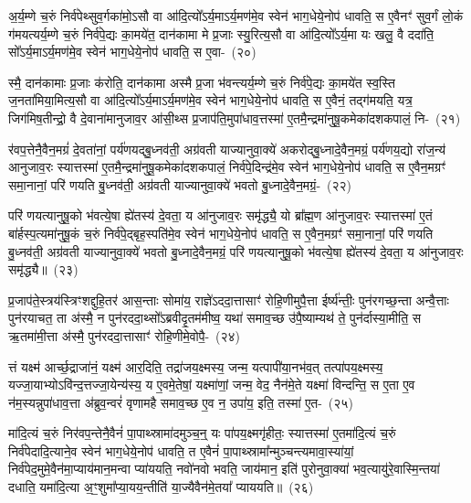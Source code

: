 {}

अ॒र्य॒म्णे च॒रुं निर्व॑पेथ्सुव॒र्गका॑मो॒\-ऽसौ वा आ॑दि॒त्यो᳚\-ऽर्य॒मा\-ऽर्य॒मण॑मे॒व स्वेन॑ भाग॒धेये॒नोप॑ धावति॒ स ए॒वैनꣳ॑ सुव॒र्गं लो॒कं ग॑मयत्यर्य॒म्णे च॒रुं निर्व॑पे॒द्यः का॒मये॑त॒ दान॑कामा मे प्र॒जाः स्यु॒रित्य॒सौ वा आ॑दि॒त्यो᳚\-ऽर्य॒मा यः खलु॒ वै ददा॑ति॒ सो᳚\-ऽर्य॒मा\-ऽर्य॒मण॑मे॒व स्वेन॑ भाग॒धेये॒नोप॑ धावति॒ स ए॒वा-~(२०)\ip

स्मै॒ दान॑कामाः प्र॒जाः क॑रोति॒ दान॑कामा अस्मै प्र॒जा भ॑वन्त्यर्य॒म्णे च॒रुं निर्व॑पे॒द्यः का॒मये॑त स्व॒स्ति ज॒नता॑मिया॒मित्य॒सौ वा आ॑दि॒त्यो᳚\-ऽर्य॒मा\-ऽर्य॒मण॑मे॒व स्वेन॑ भाग॒धेये॒नोप॑ धावति॒ स ए॒वैनं॒ तद्ग॑मयति॒ यत्र॒ जिग॑मिष॒तीन्द्रो॒ वै दे॒वाना॑मानुजाव॒र आ॑सी॒थ्स प्र॒जा\-प॑ति॒मुपा॑धाव॒त्तस्मा॑ ए॒तमै॒न्द्रमा॑नुषू॒कमेका॑\-दश\-कपालं॒ नि-~(२१)\ip

र॑वप॒त्तेनै॒वैन॒मग्रं॑ दे॒वता॑नां॒ पर्य॑णयद्बु॒ध्नव॑ती॒ अग्र॑वती याज्यानुवा॒क्ये॑ अकरोद्बु॒ध्नादे॒वैन॒मग्रं॒ पर्य॑णय॒द्यो रा॑ज॒न्य॑ आनुजाव॒रः स्यात्तस्मा॑ ए॒तमै॒न्द्रमा॑नुषू॒कमेका॑\-दश\-कपालं॒ निर्व॑पे॒दिन्द्र॑मे॒व स्वेन॑ भाग॒धेये॒नोप॑ धावति॒ स ए॒वैन॒मग्रꣳ॑ समा॒नानां॒ परि॑ णयति बु॒ध्नव॑ती॒ अग्र॑वती याज्यानुवा॒क्ये॑ भवतो बु॒ध्नादे॒वैन॒मग्रं॒-~(२२)\ip

परि॑ णयत्यानुषू॒को भ॑वत्ये॒षा ह्ये॑तस्य॑ दे॒वता॒ य आ॑नुजाव॒रः समृ॑द्ध्यै॒ यो ब्रा᳚ह्म॒ण आ॑नुजाव॒रः स्यात्तस्मा॑ ए॒तं बा॑र्\mbox{}हस्प॒त्यमा॑नुषू॒कं च॒रुं निर्व॑पे॒द्बृह॒स्पति॑मे॒व स्वेन॑ भाग॒धेये॒नोप॑ धावति॒ स ए॒वैन॒मग्रꣳ॑ समा॒नानां॒ परि॑ णयति बु॒ध्नव॑ती॒ अग्र॑वती याज्यानुवा॒क्ये॑ भवतो बु॒ध्नादे॒वैन॒मग्रं॒ परि॑ णयत्यानुषू॒को भ॑वत्ये॒षा ह्ये॑तस्य॑ दे॒वता॒ य आ॑नुजाव॒रः समृ॑द्ध्यै॥~(२३)\ip

{\anuvakamend[{ए॒व निरग्र॑मे॒तस्य॑ च॒त्वारि॑ च}]}

प्र॒जा\-प॑ते॒स्त्रय॑स्त्रिꣳशद्दुहि॒तर॑ आस॒न्ताः सोमा॑य॒ राज्ञे॑\-ऽददा॒त्तासाꣳ॑ रोहि॒णीमुपै॒त्ता ईर्ष्य॑न्तीः॒ पुन॑रगच्छ॒न्ता अन्वै॒त्ताः पुन॑रयाचत॒ ता अ॑स्मै॒ न पुन॑रददा॒थ्सो᳚\-ऽब्रवीदृ॒तम॑मीष्व॒ यथा॑ समाव॒च्छ उ॑पै॒ष्याम्यथ॑ ते॒ पुन॑र्दास्या॒मीति॒ स ऋ॒तमा॑मी॒त्ता अ॑स्मै॒ पुन॑रददा॒त्तासाꣳ॑ रोहि॒णीमे॒वोपै॒-~(२४)\ip

त्तं यक्ष्म॑ आर्च्छ॒द्राजा॑नं॒ यक्ष्म॑ आर॒दिति॒ तद्रा॑जय॒क्ष्मस्य॒ जन्म॒ यत्पापी॑या॒नभ॑व॒त् तत्पा॑प\-य॒क्ष्मस्य॒ यज्जा॒याभ्यो\-ऽवि॑न्द॒त्तज्जा॒येन्य॑स्य॒ य ए॒वमे॒तेषां॒ यक्ष्मा॑णां॒ जन्म॒ वेद॒ नैन॑मे॒ते यक्ष्मा॑ विन्दन्ति॒ स ए॒ता ए॒व न॑म॒स्यन्नुपा॑धाव॒त्ता अ॑ब्रुव॒न्वरं॑ वृणामहै समाव॒च्छ ए॒व न॒ उपा॑य॒ इति॒ तस्मा॑ ए॒त-~(२५)\ip

मा॑दि॒त्यं च॒रुं निर॑वप॒न्तेनै॒वैनं॑ पा॒पाथ्स्रामा॑दमुञ्च॒न्॒ यः पा॑पय॒क्ष्मगृ॑हीतः॒ स्यात्तस्मा॑ ए॒तमा॑दि॒त्यं च॒रुं निर्व॑पेदादि॒त्याने॒व स्वेन॑ भाग॒धेये॒नोप॑ धावति॒ त ए॒वैनं॑ पा॒पाथ्स्रामा᳚न्मुञ्चन्त्यमावा॒स्या॑यां॒ निर्व॑पेद॒मुमे॒वैन॑मा॒प्याय॑मान॒मन्वा प्या॑ययति॒ नवो॑नवो भवति॒ जाय॑\-मान॒ इति॑ पुरोनुवा॒क्या॑ भव॒त्यायु॑रे॒वास्मि॒न्तया॑ दधाति॒ यमा॑\-दि॒त्या अ॒ꣳ॒शुमा᳚प्या॒यय॒न्तीति॑ या॒ज्यैवैन॑मे॒तया᳚ प्याययति॥~(२६)\ip

